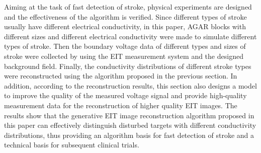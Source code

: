 \begin{englishabstract}
Aiming at the task of fast detection of stroke, physical experiments are designed and the effectiveness of the algorithm is verified.
Since different types of stroke usually have different electrical conductivity,  in this paper, 
AGAR blocks with different sizes and different electrical conductivity were made to simulate different types of stroke. 
Then the boundary voltage data of different types and sizes of stroke were collected by using the EIT measurement system and the designed 
background field. Finally, the conductivity distributions of different stroke types were reconstructed using the algorithm proposed in the previous section.
In addition, according to the reconstruction results, this section also designs a model to improve the quality of 
the measured voltage signal and provide high-quality measurement data for the reconstruction of higher quality EIT images.
The results show that the generative EIT image reconstruction algorithm proposed in this paper can 
effectively distinguish disturbed targets with different conductivity distributions, 
thus providing an algorithm basis for fast detection of stroke and a technical basis for subsequent clinical trials.





\end{englishabstract}